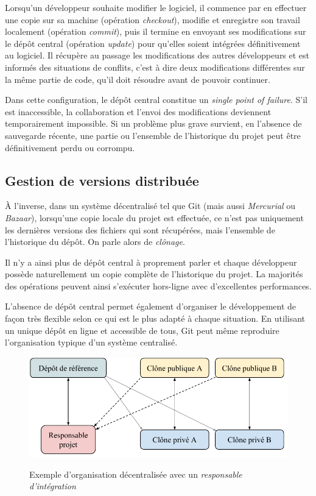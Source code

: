 \documentclass[11pt,a4paper]{article}
\begin{document}
Lorsqu'un développeur souhaite modifier le logiciel, il commence par en effectuer une copie sur sa machine (opération \textit{checkout}), modifie et enregistre son travail localement (opération \textit{commit}), puis il termine en envoyant ses modifications sur le dépôt central (opération \textit{update}) pour qu'elles soient intégrées définitivement au logiciel.
Il récupère au passage les modifications des autres développeurs et est informés des situations de conflits, c'est à dire deux modifications différentes sur la même partie de code, qu'il doit résoudre avant de pouvoir continuer.

Dans cette configuration, le dépôt central constitue un \textit{single point of failure}.
S'il est inaccessible, la collaboration et l'envoi des modifications deviennent temporairement impossible.
Si un problème plus grave survient, en l'absence de sauvegarde récente, une partie ou l'ensemble de l'historique du projet peut être définitivement perdu ou corrompu.

\subsection{Gestion de versions distribuée}

À l'inverse, dans un système décentralisé tel que Git (mais aussi \textit{Mercurial} ou \textit{Bazaar}), lorsqu'une copie locale du projet est effectuée, ce n'est pas uniquement les dernières versions des fichiers qui sont récupérées, mais l'ensemble de l'historique du dépôt.
On parle alors de \textit{clônage}.

Il n'y a ainsi plus de dépôt central à proprement parler et chaque développeur possède naturellement un copie complète de l'historique du projet.
La majorités des opérations peuvent ainsi s'exécuter hors-ligne avec d'excellentes performances.

L'absence de dépôt central permet également d'organiser le développement de façon très flexible selon ce qui est le plus adapté à chaque situation.
En utilisant un unique dépôt en ligne et accessible de tous, Git peut même reproduire l'organisation typique d'un système centralisé.

\begin{figure}[ht]
\begin{center}
\includegraphics[width=11.5cm]{img_dvcs} \cite{progit}
\caption{Exemple d'organisation décentralisée avec un \textit{responsable d'intégration}}
\end{center}
\end{figure}
\end{document}
